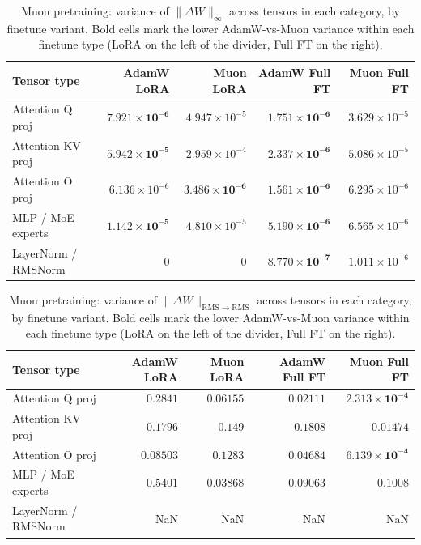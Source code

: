 \begin{table}[h]
\centering
\begin{tabular}{lrr|rr}
\toprule
Tensor type & AdamW LoRA & Muon LoRA & AdamW Full FT & Muon Full FT \\
\midrule
Attention Q proj & $\mathbf{7.921 \times 10^{-6}}$ & $4.947 \times 10^{-5}$ & $\mathbf{1.751 \times 10^{-6}}$ & $3.629 \times 10^{-5}$ \\
Attention KV proj & $\mathbf{5.942 \times 10^{-5}}$ & $2.959 \times 10^{-4}$ & $\mathbf{2.337 \times 10^{-6}}$ & $5.086 \times 10^{-5}$ \\
Attention O proj & $6.136 \times 10^{-6}$ & $\mathbf{3.486 \times 10^{-6}}$ & $\mathbf{1.561 \times 10^{-6}}$ & $6.295 \times 10^{-6}$ \\
MLP / MoE experts & $\mathbf{1.142 \times 10^{-5}}$ & $4.810 \times 10^{-5}$ & $\mathbf{5.190 \times 10^{-6}}$ & $6.565 \times 10^{-6}$ \\
LayerNorm / RMSNorm & $0$ & $0$ & $\mathbf{8.770 \times 10^{-7}}$ & $1.011 \times 10^{-6}$ \\
\bottomrule
\end{tabular}
\caption{Muon pretraining: variance of $\|\Delta W\|_\infty$ across tensors in each category, by finetune variant. Bold cells mark the lower AdamW-vs-Muon variance within each finetune type (LoRA on the left of the divider, Full FT on the right).}
\label{tab:var-muon-l-inf}
\end{table}

\begin{table}[h]
\centering
\begin{tabular}{lrr|rr}
\toprule
Tensor type & AdamW LoRA & Muon LoRA & AdamW Full FT & Muon Full FT \\
\midrule
Attention Q proj & $0.2841$ & $\mathbf{0.06155}$ & $0.02111$ & $\mathbf{2.313 \times 10^{-4}}$ \\
Attention KV proj & $0.1796$ & $\mathbf{0.149}$ & $0.1808$ & $\mathbf{0.01474}$ \\
Attention O proj & $\mathbf{0.08503}$ & $0.1283$ & $0.04684$ & $\mathbf{6.139 \times 10^{-4}}$ \\
MLP / MoE experts & $0.5401$ & $\mathbf{0.03868}$ & $\mathbf{0.09063}$ & $0.1008$ \\
LayerNorm / RMSNorm & \textrm{NaN} & \textrm{NaN} & \textrm{NaN} & \textrm{NaN} \\
\bottomrule
\end{tabular}
\caption{Muon pretraining: variance of $\|\Delta W\|_{\mathrm{RMS}\rightarrow\mathrm{RMS}}$ across tensors in each category, by finetune variant. Bold cells mark the lower AdamW-vs-Muon variance within each finetune type (LoRA on the left of the divider, Full FT on the right).}
\label{tab:var-muon-rms-rms-induced}
\end{table}

